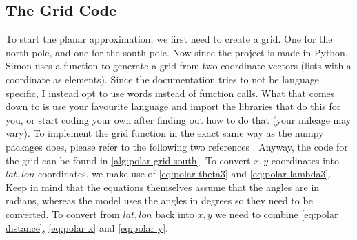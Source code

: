 \subsection{The Grid Code}
To start the planar approximation, we first need to create a grid. One for the north pole, and one for the south pole. Now since the project is made in Python, Simon uses a function to generate 
a grid from two coordinate vectors (lists with a coordinate as elements). Since the documentation tries to not be language specific, I instead opt to use words instead of function calls. What 
that comes down to is use your favourite language and import the libraries that do this for you, or start coding your own after finding out how to do that (your mileage may vary). To implement 
the grid function in the exact same way as the numpy packages does, please refer to the following two references \cite{meshgridDoc} \cite{meshgridGFG}. Anyway, the code for the grid can be found 
in \autoref{alg:polar grid south}. To convert $x, y$ coordinates into $lat, lon$ coordinates, we make use of \autoref{eq:polar theta3} and \autoref{eq:polar lambda3}. Keep in mind that the 
equations themselves assume that the angles are in radians, whereas the model uses the angles in degrees so they need to be converted. To convert from $lat, lon$ back into $x, y$ we need to 
combine \autoref{eq:polar distance}, \autoref{eq:polar x} and \autoref{eq:polar y}.

